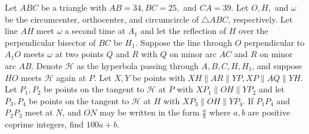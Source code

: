 Let $ABC$ be a triangle with $AB=34,BC=25,$ and $CA=39$. Let $O,H,$ and $ \omega$ be the circumcenter, orthocenter, and circumcircle of $\triangle ABC$, respectively. Let line $AH$ meet $\omega$ a second time at $A_1$ and let the reflection of $H$ over the perpendicular bisector of $BC$ be $H_1$. Suppose the line through $O$ perpendicular to $A_1O$ meets $\omega$ at two points $Q$ and $R$ with $Q$ on minor arc $AC$ and $R$ on minor arc $AB$. Denote $\mathcal H$ as the hyperbola passing through $A,B,C,H,H_1$, and suppose $HO$ meets $\mathcal H$ again at $P$. Let $X,Y$ be points with $XH \parallel AR \parallel YP, XP \parallel AQ \parallel YH$. Let $P_1,P_2$ be points on the tangent to $\mathcal H$ at $P$ with $XP_1 \parallel OH \parallel YP_2$ and let $P_3,P_4$ be points on the tangent to $\mathcal H$ at $H$ with $XP_3 \parallel OH \parallel YP_4$. If $P_1P_4$ and $P_2P_3$ meet at $N$, and $ON$ may be written in the form $\frac{a}{b}$ where $a,b$ are positive coprime integers, find $100a+b$.
